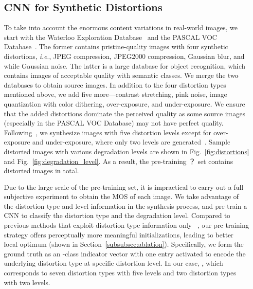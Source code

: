\documentclass[journal]{IEEEtran}
\begin{document}
\subsection{CNN for Synthetic Distortions}\label{subsec:scnn}
To take into account the enormous content variations in real-world images, we start with the Waterloo Exploration Database~\cite{ma2017waterloo} and the PASCAL VOC Database~\cite{everingham2010pascal}. The former contains  pristine-quality images with four synthetic distortions, \textit{i.e.}, JPEG compression, JPEG2000 compression, Gaussian blur, and while Gaussian noise. The latter is a large database for object recognition, which contains  images of acceptable quality with  semantic classes. We merge the two databases to obtain  source images. In addition to the four distortion types mentioned above, we add five more---contrast stretching, pink noise, image quantization with color dithering, over-exposure, and under-exposure. We ensure that the added distortions dominate the perceived quality as some source images (especially in the PASCAL VOC Database) may not have perfect quality. Following~\cite{ma2017waterloo}, we synthesize images with five distortion levels except for over-exposure and under-exposure, where only two levels are generated~\cite{Ma2015Perceptual}. Sample distorted images with various degradation levels are shown in Fig.~\ref{fig:distortions} and Fig.~\ref{fig:degradation_level}. As a result, the pre-training ？ set contains  distorted images in total.












Due to the large scale of the pre-training set, it is impractical to carry out a full subjective experiment to obtain the MOS of each image. We take advantage of the distortion type and level information in the synthesis process, and pre-train a CNN to classify the distortion type and the degradation level. Compared to previous methods that  exploit distortion type information only~\cite{Ma2018End,Kang2015Simultaneous} , our pre-training strategy offers perceptually more meaningful initializations, leading to better local optimum (shown in Section~\ref{subsubsec:ablation}). Specifically, we form the ground truth as an -class indicator vector with one entry activated to encode the underlying distortion type at specific distortion level. In our case, ,  which corresponds to seven distortion types with five levels and two distortion types with two levels.
\end{document}

